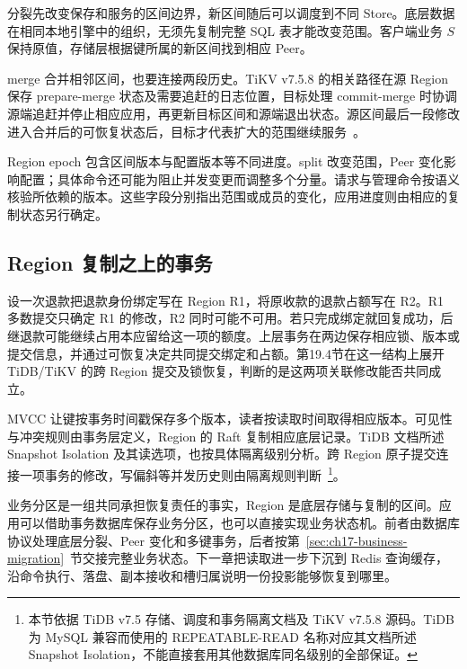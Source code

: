 
分裂先改变保存和服务的区间边界，新区间随后可以调度到不同 Store。底层数据在相同本地引擎中的组织，无须先复制完整 SQL 表才能改变范围。客户端业务 $S$ 保持原值，存储层根据键所属的新区间找到相应 Peer。

merge 合并相邻区间，也要连接两段历史。TiKV v7.5.8 的相关路径在源 Region 保存 prepare-merge 状态及需要追赶的日志位置，目标处理 commit-merge 时协调源端追赶并停止相应应用，再更新目标区间和源端退出状态。源区间最后一段修改进入合并后的可恢复状态后，目标才代表扩大的范围继续服务~\cite{tikv-758-raftstore}。

Region epoch 包含区间版本与配置版本等不同进度。split 改变范围，Peer 变化影响配置；具体命令还可能为阻止并发变更而调整多个分量。请求与管理命令按语义核验所依赖的版本。这些字段分别指出范围或成员的变化，应用进度则由相应的复制状态另行确定。

\subsection*{Region 复制之上的事务}

设一次退款把退款身份绑定写在 Region R1，将原收款的退款占额写在 R2。R1 多数提交只确定 R1 的修改，R2 同时可能不可用。若只完成绑定就回复成功，后继退款可能继续占用本应留给这一项的额度。上层事务在两边保存相应锁、版本或提交信息，并通过可恢复决定共同提交绑定和占额。第19.4节在这一结构上展开 TiDB/TiKV 的跨 Region 提交及锁恢复，判断的是这两项关联修改能否共同成立。

MVCC 让键按事务时间戳保存多个版本，读者按读取时间取得相应版本。可见性与冲突规则由事务层定义，Region 的 Raft 复制相应底层记录。TiDB 文档所述 Snapshot Isolation 及其读选项，也按具体隔离级别分析。跨 Region 原子提交连接一项事务的修改，写偏斜等并发历史则由隔离规则判断~\cite{tikv-75-transactions}\footnote{本节依据 TiDB v7.5 存储、调度和事务隔离文档及 TiKV v7.5.8 源码。TiDB 为 MySQL 兼容而使用的 REPEATABLE-READ 名称对应其文档所述 Snapshot Isolation，不能直接套用其他数据库同名级别的全部保证。}。

业务分区是一组共同承担恢复责任的事实，Region 是底层存储与复制的区间。应用可以借助事务数据库保存业务分区，也可以直接实现业务状态机。前者由数据库协议处理底层分裂、Peer 变化和多键事务，后者按第~\ref{sec:ch17-business-migration}~节交接完整业务状态。下一章把读取进一步下沉到 Redis 查询缓存，沿命令执行、落盘、副本接收和槽归属说明一份投影能够恢复到哪里。
\FloatBarrier
